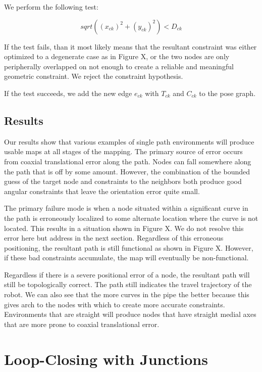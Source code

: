 We perform the following test:

\begin{equation}
sqrt( (x_{ck})^2 + (y_{ck})^2 ) < D_{ck}
\end{equation}

If the test fails, than it most likely means that the resultant constraint was either optimized to a degenerate case as in Figure X, or the two nodes are only peripherally overlapped on not enough to create a reliable and meaningful geometric constraint.  We reject the constraint hypothesis.

If the test succeeds, we add the new edge $e_{ck}$ with $T_{ck}$ and $C_{ck}$ to the pose graph.

\subsection{Results}

Our results show that various examples of single path environments will produce usable maps at all stages of the mapping.  The primary source of error occurs from coaxial translational error along the path.  Nodes can fall somewhere along the path that is off by some amount.  However, the combination of the bounded guess of the target node and constraints to the neighbors both produce good angular constraints that leave the orientation error quite small.

The primary failure mode is when a node situated within a significant curve in the path is erroneously localized to some alternate location where the curve is not located.  This results in a situation shown in Figure X.  We do not resolve this error here but address in the next section.  Regardless of this erroneous positioning, the resultant path is still functional as shown in Figure X.  However, if these bad constraints accumulate, the map will eventually be non-functional.

Regardless if there is a severe positional error of a node, the resultant path will still be topologically correct.  The path still indicates the travel trajectory of the robot.  We can also see that the more curves in the pipe the better because this gives arch to the nodes with which to create more accurate constraints.  Environments that are straight will produce nodes that have straight medial axes that are more prone to coaxial translational error.

\section{Loop-Closing with Junctions}

